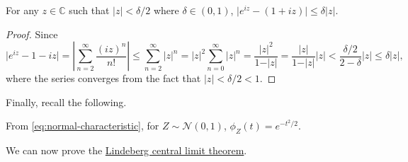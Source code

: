 \begin{lemma}\label{lma:Lindeberg-CLT-4}
	For any \(z \in \mathbb{C} \) such that \(\vert z \vert < \delta / 2\) where \(\delta \in (0, 1)\), \(\vert e^{iz} - (1 + iz) \vert \leq \delta \vert z \vert \).
\end{lemma}
\begin{proof}
	Since
	\[
		\vert e^{iz} - 1 - iz \vert
		= \left\vert \sum_{n=2}^{\infty} \frac{(iz)^n}{n!} \right\vert
		\leq \sum_{n=2}^{\infty} \vert z \vert ^n
		= \vert z \vert ^2 \sum_{n=0}^{\infty} \vert z \vert ^n
		= \frac{\vert z \vert ^2}{1 - \vert z \vert }
		= \frac{\vert z \vert }{1 - \vert z \vert } \vert z \vert
		< \frac{\delta / 2}{2 - \delta } \vert z \vert
		\leq \delta \vert z \vert ,
	\]
	where the series converges from the fact that \(\vert z \vert < \delta / 2 < 1\).
\end{proof}

Finally, recall the following.

\begin{prev}
	From \autoref{eq:normal-characteristic}, for \(Z \sim \mathcal{N} (0, 1)\), \(\phi _Z(t) = e^{-t^2 / 2}\).
\end{prev}

We can now prove the \hyperref[thm:Lindeberg-CLT]{Lindeberg central limit theorem}.

